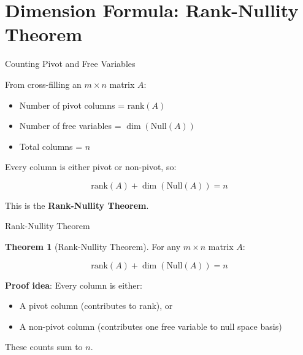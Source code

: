 \documentclass[10pt]{beamer}
\theoremstyle{definition}
\newtheorem{thm}{Theorem}[section]
\newcommand{\x}[1]{\alert{\textbf{#1}}}
\begin{document}
\section{Dimension Formula: Rank-Nullity Theorem}

\begin{frame}{Counting Pivot and Free Variables}

From cross-filling an $m \times n$ matrix $A$:

\begin{itemize}
\item Number of pivot columns = $\text{rank}(A)$
\item Number of free variables = $\dim(\text{Null}(A))$
\item Total columns = $n$
\end{itemize}

\vspace{1em}

Every column is either pivot or non-pivot, so:

$$\text{rank}(A) + \dim(\text{Null}(A)) = n$$

\vspace{1em}

This is the \x{Rank-Nullity Theorem}.

\end{frame}

\begin{frame}{Rank-Nullity Theorem}

\begin{thm}[Rank-Nullity Theorem]
For any $m \times n$ matrix $A$:

$$\boxed{\text{rank}(A) + \dim(\text{Null}(A)) = n}$$
\end{thm}

\vspace{1em}

\x{Proof idea}: Every column is either:
\begin{itemize}
\item A pivot column (contributes to rank), or
\item A non-pivot column (contributes one free variable to null space basis)
\end{itemize}

These counts sum to $n$.

\end{frame}
\end{document}
